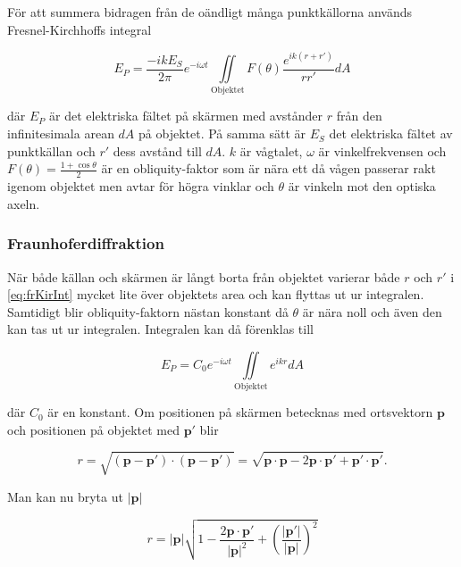 \documentclass[a4paper]{article}
\begin{document}
För att summera bidragen från de oändligt många punktkällorna används Fresnel-Kirchhoffs integral \cite[p.~330]{pearsonIntroOpt}

\begin{equation}
	E_P = \frac{-i k E_S}{2\pi} e^{-i \omega t} \iint\limits_{\mathrm{Objektet}} {F(\theta)\frac{e^{i k (r + r')}}{r r'} d A}
	\label{eq:frKirInt}
\end{equation}

där $E_P$ är det elektriska fältet på skärmen med avstånder $r$ från den infinitesimala arean $d A$ på objektet. På samma sätt är $E_S$ det elektriska fältet av punktkällan och $r'$ dess avstånd till $d A$. $k$ är vågtalet, $\omega$ är vinkelfrekvensen och $F(\theta) = \frac{1 + \cos\theta}{2}$ är en obliquity-faktor som är nära ett då vågen passerar rakt igenom objektet men avtar för högra vinklar och $\theta$ är vinkeln mot den optiska axeln.

\subsubsection{Fraunhoferdiffraktion}

När både källan och skärmen är långt borta från objektet varierar både $r$ och $r'$ i \eqref{eq:frKirInt} mycket lite över objektets area och kan flyttas ut ur integralen. Samtidigt blir obliquity-faktorn nästan konstant då $\theta$ är nära noll och även den kan tas ut ur integralen. Integralen kan då förenklas till \cite[p.~331]{pearsonIntroOpt}

\begin{equation}
	E_P = C_0 e^{-i \omega t} \iint\limits_{\mathrm{Objektet}} {e^{i k r} dA}
	\label{eq:fraunhofer}
\end{equation}

där $C_0$ är en konstant. Om positionen på skärmen betecknas med ortsvektorn $\boldsymbol{p}$ och positionen på objektet med $\boldsymbol{p'}$ blir

\begin{equation}
	r = \sqrt{(\boldsymbol{p} - \boldsymbol{p'})\cdot(\boldsymbol{p} - \boldsymbol{p'})} = \sqrt{\boldsymbol{p}\cdot\boldsymbol{p} - 2 \boldsymbol{p}\cdot\boldsymbol{p'} + \boldsymbol{p'}\cdot\boldsymbol{p'}}\text{.}
\end{equation}

Man kan nu bryta ut $|\boldsymbol{p}|$

\begin{equation}
r = |\boldsymbol{p}|\sqrt{1 - \frac{2\boldsymbol{p}\cdot\boldsymbol{p'}}{|\boldsymbol{p}|^2} + \left(\frac{|\boldsymbol{p'}|}{|\boldsymbol{p}|}\right)^2}
\end{equation}
\end{document}
